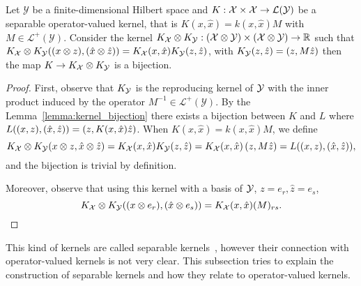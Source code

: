 \begin{lemma}
    Let $\mathcal{Y}$ be a finite-dimensional Hilbert space and
    $K: \mathcal{X} \times \mathcal{X} \to \mathcal{L}(\mathcal{Y})$
    be a separable operator-valued kernel, that is
    $K(x, \hat{x}) = k(x, \hat{x})M$
    with $M \in \mathcal{L}^+(\mathcal{Y})$.   
    Consider the kernel
    $K_{\mathcal{X}} \otimes K_{\mathcal{Y}}: (\mathcal{X} \otimes \mathcal{Y}) \times (\mathcal{X} \otimes \mathcal{Y}) \to \mathbb{R}$
    such that $K_{\mathcal{X}} \otimes K_{\mathcal{Y}}((x \otimes z), (\hat{x} \otimes \hat{z})) = K_{\mathcal{X}}(x, \hat{x}) K_{\mathcal{Y}}(z, \hat{z})$, with $K_{\mathcal{Y}}(z, \hat{z}) = \left( z, M \hat{z} \right)$ then the map $K \to K_{\mathcal{X}} \otimes K_{\mathcal{Y}}$ is a bijection.
\end{lemma}
\begin{proof}
    First, observe that $K_{\mathcal{Y}}$ is the reproducing kernel of $\mathcal{Y}$ with the inner product induced by the operator $M^{-1} \in \mathcal{L}^+(\mathcal{Y})$.
    By the Lemma~\ref{lemma:kernel_bijection} there exists a bijection between $K$ and $L$ where $L((x, z), (\hat{x}, \hat{z})) = \left( z, K(x, \hat{x}) \hat{z} \right)$. When $K(x, \hat{x}) = k(x, \hat{x})M$, we define 
    $$ K_{\mathcal{X}} \otimes K_{\mathcal{Y}}(x \otimes z, \hat{x} \otimes \hat{z}) = K_{\mathcal{X}}(x, \hat{x}) K_{\mathcal{Y}}(z, \hat{z}) = K_{\mathcal{X}}(x, \hat{x}) \left( z, M \hat{z} \right) = L((x, z), (\hat{x}, \hat{z})) ,$$
    and the bijection is trivial by definition.

    Moreover, observe that using this kernel with a basis of $\mathcal{Y}$,  $z=e_r, \hat{z}=e_s$, 
    $$ K_{\mathcal{X}} \otimes K_{\mathcal{Y}}((x \otimes e_r) , (\hat{x} \otimes e_s)) = K_{\mathcal{X}}(x, \hat{x}) (M)_{rs}.$$
\end{proof}
This kind of kernels are called separable kernels~\cite{AlvarezRL12, KadriDPCRA16}, however their connection with operator-valued kernels is not very clear. This subsection tries to explain the construction of separable kernels and how they relate to operator-valued kernels.
 



